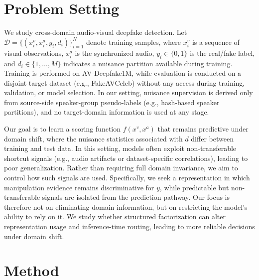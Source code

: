 \documentclass{article}
\begin{document}

\section{Problem Setting}
We study cross-domain audio-visual deepfake detection. Let $\mathcal{D} = \{(x_i^v, x_i^a, y_i, d_i)\}_{i=1}^N$ denote training samples, where $x_i^v$ is a sequence of visual observations, $x_i^a$ is the synchronized audio, $y_i \in \{0,1\}$ is the real/fake label, and $d_i \in \{1,\dots,M\}$ indicates a nuisance partition available during training.
Training is performed on AV-Deepfake1M, while evaluation is conducted on a disjoint target dataset (e.g., FakeAVCeleb) without any access during training, validation, or model selection. In our setting, nuisance supervision is derived only from source-side speaker-group pseudo-labels (e.g., hash-based speaker partitions), and no target-domain information is used at any stage.

Our goal is to learn a scoring function $f(x^v, x^a)$ that remains predictive under domain shift, where the nuisance statistics associated with $d$ differ between training and test data. In this setting, models often exploit non-transferable shortcut signals (e.g., audio artifacts or dataset-specific correlations), leading to poor generalization.
Rather than requiring full domain invariance, we aim to control how such signals are used. Specifically, we seek a representation in which manipulation evidence remains discriminative for $y$, while predictable but non-transferable signals are isolated from the prediction pathway. 
Our focus is therefore not on eliminating domain information, but on restricting the model's ability to rely on it. We study whether structured factorization can alter representation usage and inference-time routing, leading to more reliable decisions under domain shift.

\section{Method}
\end{document}
